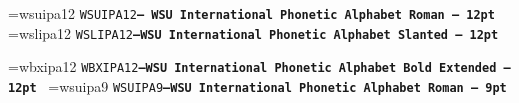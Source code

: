 \newpage
\font\chartfont=wsuipa12
{\tt WSUIPA12\bf--- WSU International Phonetic Alphabet Roman -- 12pt}
\beginchart{\chartfont}
\normalchart
\endchart
\vfill
\font\newchartfont=wslipa12
{\tt WSLIPA12\bf---WSU International Phonetic Alphabet Slanted -- 12pt}
\nopagebreak
\beginchart{\newchartfont}
\normalchart
\endchart

\newpage
\font\nchartfont=wbxipa12
{\tt WBXIPA12\bf---WSU International Phonetic Alphabet Bold Extended
-- 12pt}\
\beginchart{\nchartfont}
\normalchart
\endchart
\vfill
\font\nwchartfont=wsuipa9
{\tt WSUIPA9\bf---WSU International Phonetic Alphabet Roman -- 9pt}\relax
\nopagebreak
\beginchart{\nwchartfont}
\normalchart
\endchart


